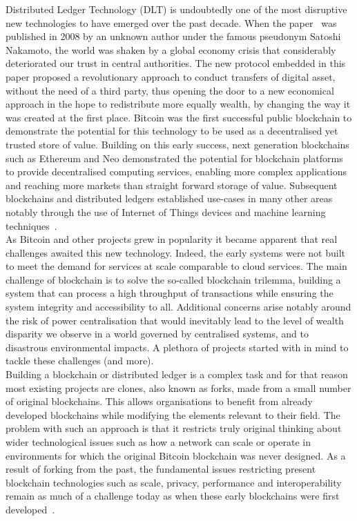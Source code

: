 Distributed Ledger Technology (DLT) is undoubtedly one of the most disruptive new  technologies to have emerged over the past decade. When the paper~\cite{nakamoto} was published in 2008 by an unknown author under the famous pseudonym Satoshi Nakamoto, the world was shaken by a global economy crisis that considerably deteriorated our trust in central authorities. The new protocol embedded in this paper proposed a revolutionary approach to conduct transfers of digital asset, without the need of a third party, thus opening the door to a new economical approach in the hope to redistribute more equally wealth, by changing the way it was created at the first place. Bitcoin was the first successful public blockchain to demonstrate the potential for this technology to be used as a decentralised yet trusted store of value. Building on this early success, next generation blockchains such as Ethereum and Neo demonstrated the potential for blockchain platforms to provide decentralised computing services, enabling more complex applications and reaching more markets than straight forward storage of value. Subsequent blockchains and distributed ledgers established use-cases in many other areas notably through the use of Internet of Things devices and machine learning techniques~\cite{govuk}.\\

As Bitcoin and other projects grew in popularity it became apparent that real challenges awaited this new technology. Indeed, the early systems were not built to meet the demand for services at scale comparable to cloud services. The main challenge of blockchain is to solve the so-called blockchain trilemma, building a system that can process a high throughput of transactions while ensuring the system integrity and accessibility to all. Additional concerns arise notably around the risk of power centralisation that would inevitably lead to the level of wealth disparity we observe in a world governed by centralised systems, and to disastrous environmental impacts. A plethora of projects started with in mind to tackle these challenges (and more).\\

Building a blockchain or distributed ledger is a complex task and for that reason most existing projects are clones, also known as forks, made from a small number of original blockchains. This allows organisations to benefit from already developed blockchains while modifying the elements relevant to their field. The problem with such an approach is that it restricts truly original thinking about wider technological issues such as how a network can scale or operate in environments for which the original Bitcoin blockchain was never designed. As a result of forking from the past, the fundamental issues restricting present blockchain technologies such as scale, privacy, performance and interoperability remain as much of a challenge today as when these early blockchains were first developed~\cite{obst}.\\

